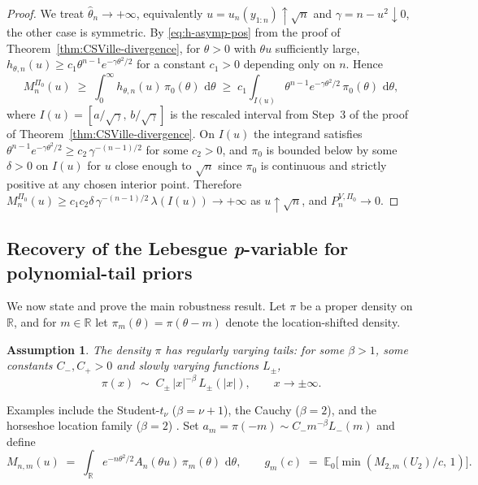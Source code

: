 \documentclass[numsec,webpdf,modern,medium,namedate]{oup-authoring-template}
\theoremstyle{thmstyleone}%
\theoremstyle{thmstyletwo}%
\theoremstyle{thmstylethree}%
\newtheorem{assumption}[theorem]{Assumption}
\newcommand{\E}{\mathbb{E}}
\newcommand{\dd}{\,\mathrm{d}}
\newcommand{\1}{\mathbf{1}}
\begin{document}
\begin{proof}
We treat \(\widehat\theta_n\to+\infty\), equivalently
\(u = u_n(y_{1:n})\uparrow\sqrt n\) and \(\gamma = n-u^2\downarrow 0\), the other case is symmetric. By \eqref{eq:h-asymp-pos} from the proof
of Theorem~\ref{thm:CSVille-divergence}, for \(\theta>0\) with \(\theta u\)
sufficiently large,
\(h_{\theta,n}(u)\geq c_1\theta^{n-1}e^{-\gamma\theta^2/2}\)
for a constant \(c_1>0\) depending only on \(n\). Hence
\[
  M_n^{\Pi_0}(u) \;\geq\; \int_0^\infty h_{\theta,n}(u)\,\pi_0(\theta)\,\dd\theta
  \;\geq\; c_1\int_{I(u)} \theta^{n-1}e^{-\gamma\theta^2/2}\,\pi_0(\theta)\,\dd\theta,
\]
where \(I(u) = [a/\sqrt\gamma,\,b/\sqrt\gamma]\) is the rescaled interval from Step~3 of the proof of Theorem~\ref{thm:CSVille-divergence}. On \(I(u)\) the integrand satisfies \(\theta^{n-1}e^{-\gamma\theta^2/2}\geq c_2\,\gamma^{-(n-1)/2}\)
for some \(c_2>0\), and \(\pi_0\) is bounded below by some \(\delta>0\) on \(I(u)\) for \(u\) close enough to \(\sqrt n\) since \(\pi_0\) is continuous and strictly positive at any chosen interior
point. Therefore \(M_n^{\Pi_0}(u)\geq c_1c_2\delta\,\gamma^{-(n-1)/2}\,
\lambda(I(u))\to+\infty\) as \(u\uparrow\sqrt n\), and \(P_n^{V,\Pi_0}\to 0\).
\end{proof}

\subsection{Recovery of the Lebesgue \textit{p}-variable for polynomial-tail priors}
\label{sec:recovery}

We now state and prove the main robustness result. Let \(\pi\) be a
proper density on \(\mathbb{R}\), and for \(m\in\mathbb{R}\) let
\(\pi_m(\theta)=\pi(\theta-m)\) denote the location-shifted density.

\begin{assumption}\label{ass:tails}
The density \(\pi\) has regularly varying tails: for some \(\beta>1\), some constants \(C_-,C_+>0\) and slowly varying functions \(L_\pm\),
\begin{equation}\label{eq:tails}
   \pi(x)\;\sim\; C_\pm\,|x|^{-\beta}\,L_\pm(|x|),\qquad x\to\pm\infty.
\end{equation}
\end{assumption}

Examples include the Student-\(t_\nu\) (\(\beta=\nu+1\)), the Cauchy
(\(\beta=2\)), and the horseshoe location family (\(\beta=2\))
\citep{Carvalho2010}. Set
\(a_m =\pi(-m)\sim C_-m^{-\beta}L_-(m)\) and define
\begin{equation}\label{eq:Mnm-def}
  M_{n,m}(u)\;=\;\int_\mathbb{R} e^{-n\theta^2/2}A_n(\theta u)\,\pi_m(\theta)
  \,\dd\theta,
  \qquad
  g_m(c)\;=\;\E_0\!\bigl[\min(M_{2,m}(U_2)/c,\,1)\bigr].
\end{equation}
\end{document}
